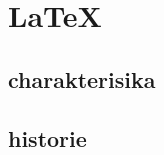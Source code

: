 \documentclass[main.tex]{subfiles}
\begin{document}
\section{\LaTeX}

\subsection{charakterisika}



\subsection{historie}
\end{document}
